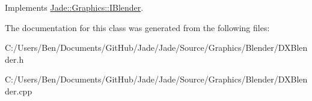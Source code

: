 Implements \hyperlink{struct_jade_1_1_graphics_1_1_i_blender}{Jade\+::\+Graphics\+::\+I\+Blender}.



The documentation for this class was generated from the following files\+:\begin{DoxyCompactItemize}
\item 
C\+:/\+Users/\+Ben/\+Documents/\+Git\+Hub/\+Jade/\+Jade/\+Source/\+Graphics/\+Blender/D\+X\+Blender.\+h\item 
C\+:/\+Users/\+Ben/\+Documents/\+Git\+Hub/\+Jade/\+Jade/\+Source/\+Graphics/\+Blender/D\+X\+Blender.\+cpp\end{DoxyCompactItemize}
